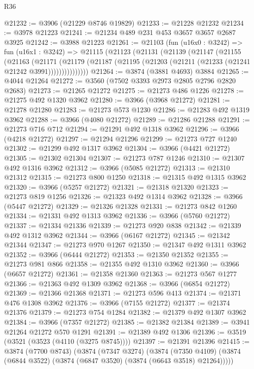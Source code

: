 \begin{lexlean}{R36}
\begin{coremodule}
@21232 := @3906 (@21229 @8746 @19829)
@21233 := @21228 @21232
@21234 := @3978 @21223
@21241 := @21234 @489 @231 @453 @3657 @3657 @2687 @3925
@21242 := @3988 @21223
@21261 := @21103
    (fun (u16x0 : @3242) =>
    fun (u16x1 : @3242) =>
    @21115
      (@21123
        (@21131
          (@21139
            (@21147
              (@21155
                (@21163
                  (@21171
                    (@21179
                      (@21187 (@21195 (@21203 (@21211 (@21233 (@21241 @21242 @3991)))))))))))))))
@21264 := @3874 (@3881 @4693) @3884
@21265 := @4044 @21264
@21272 := @3560 (@7502 @3393 @2973 @2805 @2796 @2820 @2683)
@21273 := @21265 @21272
@21275 := @21273 @486 @1226
@21278 := @21275 @492 @1320 @3962
@21280 := @3966 (@3968 @21272)
@21281 := @21278 @21280
@21283 := @21273 @573 @1230
@21286 := @21283 @492 @1319 @3962
@21288 := @3966 (@4080 @21272)
@21289 := @21286 @21288
@21291 := @21273 @716 @712
@21294 := @21291 @492 @1318 @3962
@21296 := @3966 (@4218 @21272)
@21297 := @21294 @21296
@21299 := @21273 @727 @1240
@21302 := @21299 @492 @1317 @3962
@21304 := @3966 (@4421 @21272)
@21305 := @21302 @21304
@21307 := @21273 @787 @1246
@21310 := @21307 @492 @1316 @3962
@21312 := @3966 (@5085 @21272)
@21313 := @21310 @21312
@21315 := @21273 @800 @1250
@21318 := @21315 @492 @1315 @3962
@21320 := @3966 (@5257 @21272)
@21321 := @21318 @21320
@21323 := @21273 @819 @1256
@21326 := @21323 @492 @1314 @3962
@21328 := @3966 (@5447 @21272)
@21329 := @21326 @21328
@21331 := @21273 @842 @1260
@21334 := @21331 @492 @1313 @3962
@21336 := @3966 (@5760 @21272)
@21337 := @21334 @21336
@21339 := @21273 @920 @838
@21342 := @21339 @492 @1312 @3962
@21344 := @3966 (@6167 @21272)
@21345 := @21342 @21344
@21347 := @21273 @970 @1267
@21350 := @21347 @492 @1311 @3962
@21352 := @3966 (@6444 @21272)
@21353 := @21350 @21352
@21355 := @21273 @981 @866
@21358 := @21355 @492 @1310 @3962
@21360 := @3966 (@6657 @21272)
@21361 := @21358 @21360
@21363 := @21273 @567 @1277
@21366 := @21363 @492 @1309 @3962
@21368 := @3966 (@6854 @21272)
@21369 := @21366 @21368
@21371 := @21273 @596 @413
@21374 := @21371 @476 @1308 @3962
@21376 := @3966 (@7155 @21272)
@21377 := @21374 @21376
@21379 := @21273 @754 @1284
@21382 := @21379 @492 @1307 @3962
@21384 := @3966 (@7357 @21272)
@21385 := @21382 @21384
@21389 := @3941 @21264 @21272 @570 @1291
@21391 := @21389 @492 @1306
@21396 := @3519 (@3521 (@3523 (@4110 (@3275 @8745))))
@21397 := @21391 @21396
@21415 := @3874
    (@7700 @8743)
    (@3874
      (@7347 @3274)
      (@3874
        (@7350 @4109)
        (@3874 (@6844 @3522) (@3874 (@6847 @3520) (@3874 (@6643 @3518) @21264)))))

\end{coremodule}
\end{lexlean}
